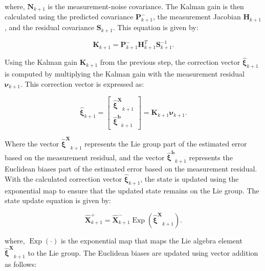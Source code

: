 \documentclass[report.tex]{subfiles}
\begin{document}
where, $\boldsymbol{N}_{k+1}$ is the measurement-noise covariance. The Kalman gain is then calculated using the predicted covariance $\boldsymbol{P}^{-}_{k+1}$, the measurement Jacobian $\boldsymbol{H}_{k+1}$, and the residual covariance $\boldsymbol{S}_{k+1}$. This equation is given by:

\begin{equation}
    \boldsymbol{K}_{k+1}
    =
    \boldsymbol{P}^{-}_{k+1}
    \boldsymbol{H}_{k+1}^{T}
    \boldsymbol{S}_{k+1}^{-1}.
    \label{eq:inekfKalmanGainBackground}
\end{equation}

Using the Kalman gain $\boldsymbol{K}_{k+1}$ from the previous step, the correction vector $\boldsymbol{\hat \xi}_{k+1}$ is computed by multiplying the Kalman gain with the measurement residual $\boldsymbol{\nu}_{k+1}$. This correction vector is expressed as:

\begin{equation} 
    \boldsymbol{\hat \xi}_{k+1}
    =
    \begin{bmatrix}
        \boldsymbol{\hat \xi^{X}}_{k+1} \\
        \boldsymbol{\hat \xi^{b}}_{k+1}
    \end{bmatrix}
    =
    \boldsymbol{K}_{k+1}
    \boldsymbol{\nu}_{k+1}.
    \label{eq:inekfCorrectionVectorBackground}
\end{equation}

Where the vector $\boldsymbol{\hat \xi^{X}}_{k+1}$ represents the Lie group part of the estimated error based on the measurement residual, and the vector $\boldsymbol{\hat \xi^{b}}_{k+1}$ represents the Euclidean biases part of the estimated error based on the measurement residual. With the calculated correction vector $\boldsymbol{\hat \xi}_{k+1}$, the state is updated using the exponential map to ensure that the updated state remains on the Lie group. The state update equation is given by:

\begin{equation}
    \hat{\boldsymbol{X}}^{+}_{k+1}
    =
    \hat{\boldsymbol{X}}^{-}_{k+1}
    \operatorname{Exp}
    \left(
        \boldsymbol{\hat \xi^{X}}_{k+1}
    \right).
    \label{eq:inekfStateCorrectionBackground}
\end{equation}

where, $\operatorname{Exp}(\cdot)$ is the exponential map that maps the Lie algebra element $\boldsymbol{\hat \xi^{X}}_{k+1}$ to the Lie group. The Euclidean biases are updated using vector addition as follows:
\end{document}
